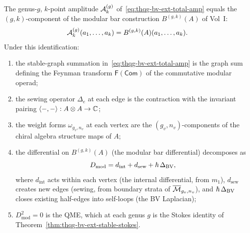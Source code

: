 \begin{theorem}[Stable-graph expansion $=$ modular bar;
\ClaimStatusProvedHere]
\label{thm:thqg-bv-ext-modular-bar}
The genus-$g$, $k$-point amplitude $\mathcal{A}_k^{(g)}$
of~\eqref{eq:thqg-bv-ext-total-amp} equals the $(g,k)$-component
of the modular bar construction $B^{(g,k)}(A)$ of Vol~I:
\begin{equation}
\mathcal{A}_k^{(g)}(a_1, \ldots, a_k)
= B^{(g,k)}(A)(a_1, \ldots, a_k).
\end{equation}
Under this identification:
\begin{enumerate}[label=(\roman*)]
\item the stable-graph summation
 in~\eqref{eq:thqg-bv-ext-total-amp} is the graph sum defining
 the Feynman transform $\mathsf{F}(\mathsf{Com})$ of the
 commutative modular operad;
\item the sewing operator $\Delta_e$ at each edge is the
 contraction with the invariant pairing
 $\langle -,- \rangle : A \otimes A \to \mathbb{C}$;
\item the weight forms $\omega_{g_v, n_v}$ at each vertex are the
 $(g_v, n_v)$-components of the chiral algebra structure
 maps of $A$;
\item the differential on $B^{(g,k)}(A)$ (the modular bar
 differential) decomposes as
 \begin{equation}
 D_{\mathrm{mod}}
 = d_{\mathrm{int}} + d_{\mathrm{sew}} + \hbar\,\Delta_{\mathrm{BV}},
 \end{equation}
 where $d_{\mathrm{int}}$ acts within each vertex (the internal
 differential, from $m_1$), $d_{\mathrm{sew}}$ creates new edges
 (sewing, from boundary strata of $\overline{\mathcal{M}}_{g_v, n_v}$),
 and $\hbar\,\Delta_{\mathrm{BV}}$ closes existing half-edges into
 self-loops (the BV Laplacian);
\item $D_{\mathrm{mod}}^2 = 0$ is the QME, which at each genus
 $g$ is the Stokes identity of
 Theorem~\ref{thm:thqg-bv-ext-stable-stokes}.
\end{enumerate}
\end{theorem}

